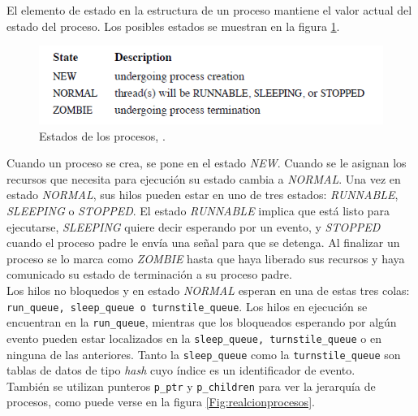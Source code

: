 \documentclass[a4paper]{book}
\begin{document}
El elemento de estado en la estructura de un proceso mantiene el valor actual del estado del proceso. Los posibles estados se muestran en la figura \ref{Fig:estadosprocesos}.\\

\begin{figure}[t]
\begin{center}
	\includegraphics[scale=0.85]{./imagenes/estadosprocesos.png}
	\caption{Estados de los procesos, \cite[Capitulo 4]{freebsdOS}.}
	\label{Fig:estadosprocesos}
\end{center}
\end{figure}

Cuando un proceso se crea, se pone en el estado \emph{NEW}. Cuando se le asignan los recursos que necesita para ejecución su estado cambia a \emph{NORMAL}. Una vez en estado \emph{NORMAL}, sus hilos pueden estar en uno de tres estados: \emph{RUNNABLE}, \emph{SLEEPING} o \emph{STOPPED}. El estado \emph{RUNNABLE} implica que está listo para ejecutarse, \emph{SLEEPING} quiere decir esperando por un evento, y \emph{STOPPED} cuando el proceso padre le envía una señal para que se detenga. Al finalizar un proceso se lo marca como \emph{ZOMBIE} hasta que haya liberado sus recursos y haya comunicado su estado de terminación a su proceso padre.\\

Los hilos no bloquedos y en estado \emph{NORMAL} esperan en una de estas tres colas: \verb|run_queue, sleep_queue o turnstile_queue|. Los hilos en ejecución se encuentran en la \verb|run_queue|, mientras que los bloqueados esperando por algún evento pueden estar localizados en la \verb|sleep_queue, turnstile_queue| o en ninguna de las anteriores. Tanto la \verb|sleep_queue| como la \verb|turnstile_queue| son tablas de datos de tipo \emph{hash} cuyo \'indice es un identificador de evento.\\

También se utilizan punteros \verb|p_ptr| y \verb|p_children| para ver la jerarquía de procesos, como puede verse en la figura \ref{Fig:realcionprocesos}.
\end{document}
